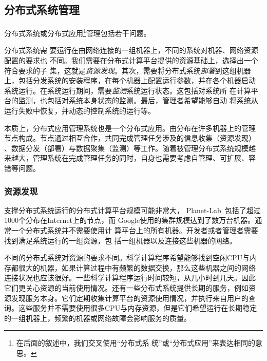 % 
% 
% 
% 
% 

\subsection{分布式系统管理}
\label{sec:intro_mgmt}

分布式系统或分布式应用\footnote{在后面的叙述中，我们交叉使用“分布式系
统”或“分布式应用”来表达相同的意思。}管理包括若干问题。

分布式系统需
要运行在由网络连接的一组机器上，不同的系统对机器、网络资源配置的要求也
不同。我们需要在分布式计算平台提供的资源基础上，选择出一个符合要求的子
集，这就是\emph{资源发现}。其次，需要将分布式系统\emph{部署}到这组机器
上，包括分发系统的安装程序，在每个机器上配置运行参数，并在各个机器启动
系统运行。在系统运行期间，需要\emph{监测}系统运行状态。这包括对系统所
在计算平台的监测，也包括对系统本身状态的监测。最后，管理者希望能够自动
将系统从运行失败中恢复，并动态的控制系统的运行等。

本质上，分布式应用管理系统也是一个分布式应用。由分布在许多机器上的管理
节点构成。节点通过相互合作，共同完成管理任务涉及的信息收集（资源发现）
、数据分发（部署）与数据聚集（监测）等工作。随着被管理分布式系统规模越
来越大，管理系统在完成管理任务的同时，自身也需要考虑自管理、可扩展、容
错等问题。

\subsubsection*{资源发现}

支撑分布式系统运行的分布式计算平台规模可能非常大，
Planet-Lab~\cite{Bavier2004}包括了超过1000个分布在Internet上的节点，而
Google使用的集群规模达到了数万台机器。通常一个分布式系统并不需要使用计
算平台上的所有机器。开发者或者管理者需要找到满足系统运行的一组资源，包
括一组机器以及连接这些机器的网络。

不同的分布式系统对资源的要求不同。科学计算程序希望能够找到空闲CPU与内
存都很大的机器，如果计算过程中有频繁的数据交换，那么这些机器之间的网络
连接状况也应该很好。一些科学计算程序运行时间较短，从几小时到几天。因此
它们更关心资源的当前使用情况。还有一些分布式系统提供长期的服务，例如资
源发现服务本身。它们定期收集计算平台的资源使用情况，并执行来自用户的查
询。这些服务并不需要使用很多CPU与内存资源，但是它们希望运行在长期稳定
的一组机器上，频繁的机器或网络故障会影响服务的质量。

